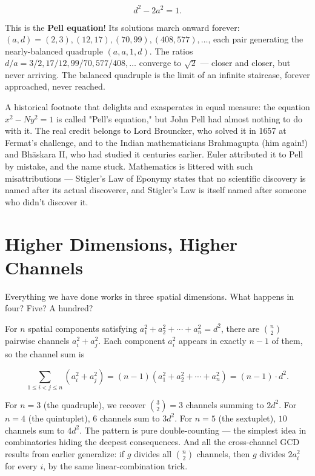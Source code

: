 \documentclass[11pt,twoside,openright]{book}
\theoremstyle{definition}
\theoremstyle{remark}
\begin{document}
\[d^2 - 2a^2 = 1.\]

This is the \textbf{Pell equation}! Its solutions march onward forever: $(a, d) = (2, 3), (12, 17), (70, 99), (408, 577), \ldots$, each pair generating the nearly-balanced quadruple $(a, a, 1, d)$. The ratios $d/a = 3/2, 17/12, 99/70, 577/408, \ldots$ converge to $\sqrt{2}$ --- closer and closer, but never arriving. The balanced quadruple is the limit of an infinite staircase, forever approached, never reached.

A historical footnote that delights and exasperates in equal measure: the equation $x^2 - Ny^2 = 1$ is called "Pell's equation," but John Pell had almost nothing to do with it. The real credit belongs to Lord Brouncker, who solved it in 1657 at Fermat's challenge, and to the Indian mathematicians Brahmagupta (him again!) and Bhāskara II, who had studied it centuries earlier. Euler attributed it to Pell by mistake, and the name stuck. Mathematics is littered with such misattributions --- Stigler's Law of Eponymy states that no scientific discovery is named after its actual discoverer, and Stigler's Law is itself named after someone who didn't discover it.



\section{Higher Dimensions, Higher Channels}

Everything we have done works in three spatial dimensions. What happens in four? Five? A hundred?

For $n$ spatial components satisfying $a_1^2 + a_2^2 + \cdots + a_n^2 = d^2$, there are $\binom{n}{2}$ pairwise channels $a_i^2 + a_j^2$. Each component $a_i^2$ appears in exactly $n - 1$ of them, so the channel sum is

\[\sum_{1 \le i < j \le n} (a_i^2 + a_j^2) = (n - 1)(a_1^2 + a_2^2 + \cdots + a_n^2) = (n - 1) \cdot d^2.\]

For $n = 3$ (the quadruple), we recover $\binom{3}{2} = 3$ channels summing to $2d^2$. For $n = 4$ (the quintuplet), $6$ channels sum to $3d^2$. For $n = 5$ (the sextuplet), $10$ channels sum to $4d^2$. The pattern is pure double-counting --- the simplest idea in combinatorics hiding the deepest consequences. And all the cross-channel GCD results from earlier generalize: if $g$ divides all $\binom{n}{2}$ channels, then $g$ divides $2a_i^2$ for every $i$, by the same linear-combination trick.
\end{document}
